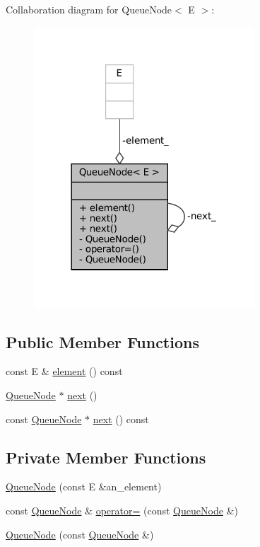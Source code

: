 Collaboration diagram for Queue\+Node$<$ E $>$\+:
\nopagebreak
\begin{figure}[H]
\begin{center}
\leavevmode
\includegraphics[width=234pt]{classQueueNode__coll__graph}
\end{center}
\end{figure}
\subsection*{Public Member Functions}
\begin{DoxyCompactItemize}
\item 
const E \& \hyperlink{classQueueNode_a1c61b3ed32e089f5901b87022ef84985}{element} () const
\item 
\hyperlink{classQueueNode}{Queue\+Node} $\ast$ \hyperlink{classQueueNode_a8a9fdf488da06533360999ef85db56ea}{next} ()
\item 
const \hyperlink{classQueueNode}{Queue\+Node} $\ast$ \hyperlink{classQueueNode_ada477e4f309f29383112dbda473dd985}{next} () const
\end{DoxyCompactItemize}
\subsection*{Private Member Functions}
\begin{DoxyCompactItemize}
\item 
\hyperlink{classQueueNode_a2c22feef35d910bec7138598e8784e25}{Queue\+Node} (const E \&an\+\_\+element)
\item 
const \hyperlink{classQueueNode}{Queue\+Node} \& \hyperlink{classQueueNode_a8635bbe6310e011ef4fcf1a01566dbb7}{operator=} (const \hyperlink{classQueueNode}{Queue\+Node} \&)
\item 
\hyperlink{classQueueNode_a35adcad7a84db46784907cf58106d585}{Queue\+Node} (const \hyperlink{classQueueNode}{Queue\+Node} \&)
\end{DoxyCompactItemize}
